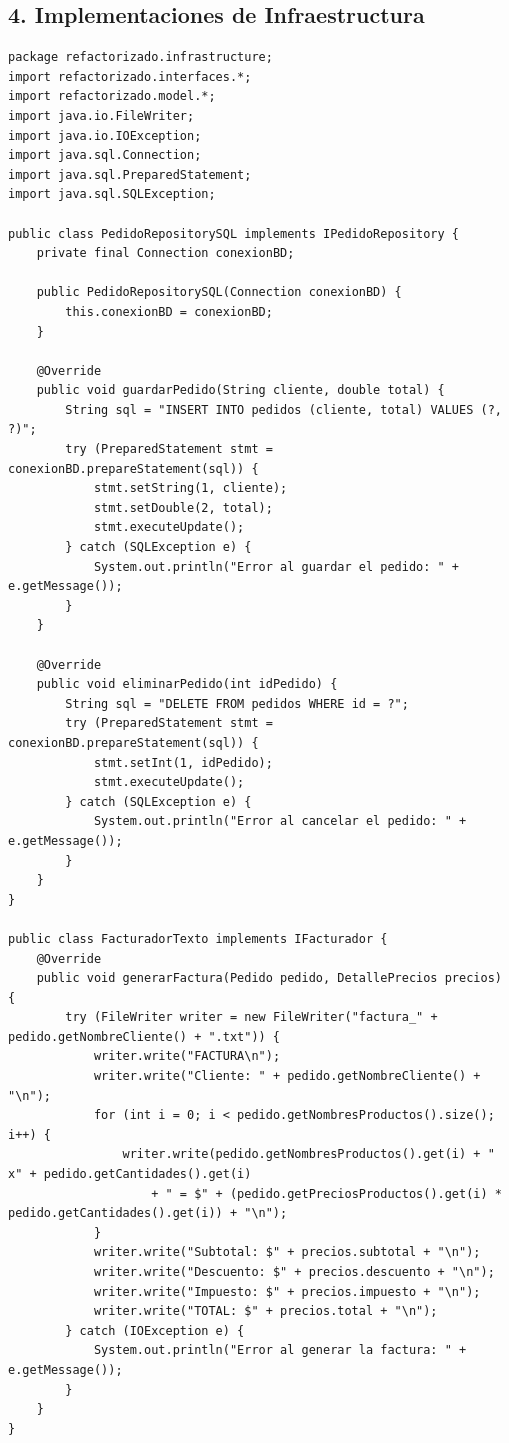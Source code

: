 \documentclass[12pt, a4paper]{article}
\begin{document}
\subsection{4. Implementaciones de Infraestructura}
\begin{lstlisting}[caption={Implementaciones Concretas}, label={lst:infraestructura}]
package refactorizado.infrastructure;
import refactorizado.interfaces.*;
import refactorizado.model.*;
import java.io.FileWriter;
import java.io.IOException;
import java.sql.Connection;
import java.sql.PreparedStatement;
import java.sql.SQLException;

public class PedidoRepositorySQL implements IPedidoRepository {
    private final Connection conexionBD;

    public PedidoRepositorySQL(Connection conexionBD) {
        this.conexionBD = conexionBD;
    }

    @Override
    public void guardarPedido(String cliente, double total) {
        String sql = "INSERT INTO pedidos (cliente, total) VALUES (?, ?)";
        try (PreparedStatement stmt = conexionBD.prepareStatement(sql)) {
            stmt.setString(1, cliente);
            stmt.setDouble(2, total);
            stmt.executeUpdate();
        } catch (SQLException e) {
            System.out.println("Error al guardar el pedido: " + e.getMessage());
        }
    }

    @Override
    public void eliminarPedido(int idPedido) {
        String sql = "DELETE FROM pedidos WHERE id = ?";
        try (PreparedStatement stmt = conexionBD.prepareStatement(sql)) {
            stmt.setInt(1, idPedido);
            stmt.executeUpdate();
        } catch (SQLException e) {
            System.out.println("Error al cancelar el pedido: " + e.getMessage());
        }
    }
}

public class FacturadorTexto implements IFacturador {
    @Override
    public void generarFactura(Pedido pedido, DetallePrecios precios) {
        try (FileWriter writer = new FileWriter("factura_" + pedido.getNombreCliente() + ".txt")) {
            writer.write("FACTURA\n");
            writer.write("Cliente: " + pedido.getNombreCliente() + "\n");
            for (int i = 0; i < pedido.getNombresProductos().size(); i++) {
                writer.write(pedido.getNombresProductos().get(i) + " x" + pedido.getCantidades().get(i)
                    + " = $" + (pedido.getPreciosProductos().get(i) * pedido.getCantidades().get(i)) + "\n");
            }
            writer.write("Subtotal: $" + precios.subtotal + "\n");
            writer.write("Descuento: $" + precios.descuento + "\n");
            writer.write("Impuesto: $" + precios.impuesto + "\n");
            writer.write("TOTAL: $" + precios.total + "\n");
        } catch (IOException e) {
            System.out.println("Error al generar la factura: " + e.getMessage());
        }
    }
}


\end{lstlisting}
\end{document}
